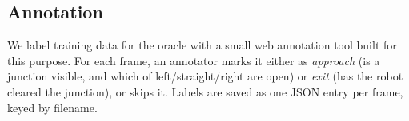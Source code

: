 \subsection{Annotation}
\label{subsec:vlm_annotation}

We label training data for the oracle with a small web annotation tool built for this purpose.
For each frame, an annotator marks it either as \textit{approach} (is a junction visible, and which of left/straight/right are open) or \textit{exit} (has the robot cleared the junction), or skips it.
Labels are saved as one JSON entry per frame, keyed by filename.
